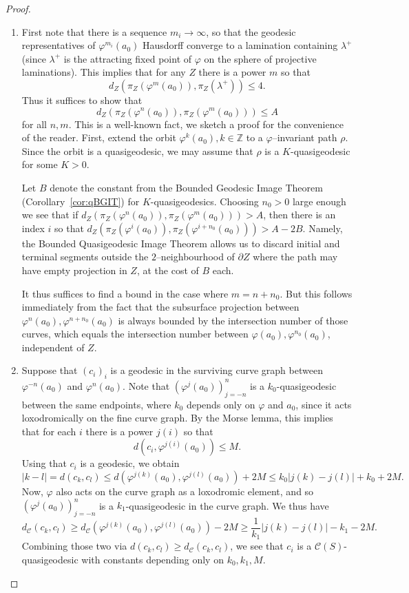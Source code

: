 \documentclass[10pt,a4paper]{amsart}
\newcommand{\C}{\mathcal{C}}
\newcommand{\dist}{d}
\begin{document}
\begin{proof}
  \begin{enumerate}
  \item First note that there is a sequence $m_i\to \infty$, so that
    the geodesic representatives of $\varphi^{m_i}(a_0)$ Hausdorff
    converge to a lamination containing $\lambda^+$ (since $\lambda^+$
    is the attracting fixed point of $\varphi$ on the sphere of
    projective laminations). This implies that for any $Z$ there is a
    power $m$ so that
    \[ \dist_Z(\pi_Z(\varphi^m(a_0)), \pi_Z(\lambda^+)) \leq 4. \] 
      Thus it suffices to show that
    \[\dist_Z(\pi_Z(\varphi^n(a_0)),\pi_Z(\varphi^m(a_0)))\leq A\]
    for all $n,m$. This is a well-known fact, we sketch a proof for
    the convenience of the reader. First, extend the
    orbit $\varphi^k(a_0), k\in\mathbb{Z}$ to a $\varphi$--invariant
    path $\rho$. Since the orbit is a quasigeodesic, we may assume
    that $\rho$ is a $K$-quasigeodesic for some $K>0$.

	Let $B$ denote the constant from the Bounded Geodesic Image Theorem (Corollary~\ref{cor:qBGIT}) for $K$-quasigeodesics.
    Choosing $n_0 > 0$ large enough we see that if
    $\dist_Z(\pi_Z(\varphi^n(a_0)),\pi_Z(\varphi^m(a_0)))> A$, then
    there is an index $i$ so that
    $\dist_Z(\pi_Z(\varphi^i(a_0)),\pi_Z(\varphi^{i+n_0}(a_0)))>
    A-2B$. Namely, the Bounded Quasigeodesic Image Theorem
    allows us to discard initial and
    terminal segments outside the $2$--neighbourhood of $\partial Z$ where the path may 	have empty projection in $Z$, at the cost of $B$ each.

    It thus suffices to find a bound in the case where 
    $m=n+n_0$. But this follows immediately from the fact that the
    subsurface projection between $\varphi^n(a_0), \varphi^{n+n_0}(a_0)$ is always
    bounded by the intersection number of those curves, which equals the intersection 	
    number between $\varphi(a_0), \varphi^{n_0}(a_0)$, independent of $Z$.
  \item Suppose that $(c_i)_i$ is a geodesic in the surviving
    curve graph between \(\varphi^{-n}(a_0)\) and
    \(\varphi^n(a_0)\). Note that $(\varphi^j(a_0))_{j=-n}^n$ is
    a $k_0$-quasigeodesic between the same endpoints, where $k_0$
    depends only on $\varphi$ and $a_0$, since it acts loxodromically on the
    fine curve graph. By the Morse lemma, this implies that for each
    $i$ there is a power $j(i)$ so that
    \[ \dist(c_i, \varphi^{j(i)}(a_0)) \leq M. \]
    Using that $c_i$ is a geodesic, we obtain
    \[ |k - l| = \dist(c_k, c_l) \leq
      d(\varphi^{j(k)}(a_0), \varphi^{j(l)}(a_0)) + 2M \leq
      k_0|j(k)-j(l)| + k_0 + 2M. \] Now, $\varphi$ also acts on the
    curve graph as a loxodromic element, and so
    $(\varphi^j(a_0))_{j=-n}^n$ is a $k_1$-quasigeodesic in the
    curve graph. We thus have
    \[ \dist_\C(c_k,c_l) \geq \dist_\C(\varphi^{j(k)}(a_0),
      \varphi^{j(l)}(a_0)) - 2M \geq \frac{1}{k_1}|j(k)-j(l)| - k_1 -
      2M. \] Combining those two via $d(c_k,c_l) \geq d_\C(c_k,c_l)$, we see that $c_i$ is a
    \(\C(S)\)-quasigeodesic with constants depending only on $k_0,k_1,M$.


\end{enumerate}
\end{proof}
\end{document}
